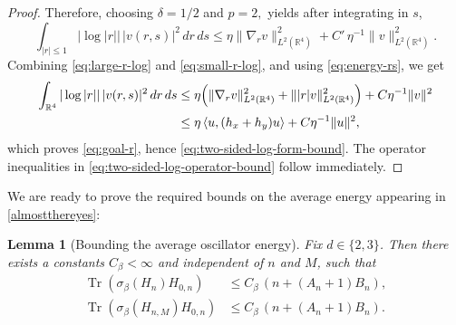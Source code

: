 \documentclass[11pt]{amsart}
\newcommand{\1}{\mathbbm{1}}
\newcommand{\Tr}{\operatorname{Tr}}
\newcommand{\R}{\mathbb{R}}
\theoremstyle{plain}
\newtheorem{lemma}[theorem]{Lemma}
\theoremstyle{definition}
\theoremstyle{remark}
\numberwithin{equation}{section}
\begin{document}
\begin{proof}
Therefore, choosing $\delta = 1/2$ and $p= 2,$ yields after integrating in \(s\),
\begin{equation}
\label{eq:small-r-log}
\int_{|r|\le1}|\log|r||\,|v(r,s)|^2\,dr\,ds
\le
\eta\|\nabla_r v\|_{L^2(\R^4)}^2 + C'\, \eta^{-1}\|v\|_{L^2(\R^4)}^2.
\end{equation}
Combining \eqref{eq:large-r-log} and \eqref{eq:small-r-log}, and using \eqref{eq:energy-rs}, we get
\begin{align*}
\int_{\R^4}|\log|r||\,|v(r,s)|^2\,dr\,ds
&\le
\eta\Bigl(\|\nabla_r v\|_{L^2(\R^4)}^2+\||r|v\|_{L^2(\R^4)}^2\Bigr)+ C \eta^{-1}\|v\|^2\\
&\le
\eta\,\langle u,(h_x+h_y)u\rangle + C \eta^{-1}\|u\|^2,
\end{align*}
which proves \eqref{eq:goal-r}, hence \eqref{eq:two-sided-log-form-bound}. The operator inequalities in \eqref{eq:two-sided-log-operator-bound} follow immediately.
\end{proof}






















\noindent We are ready to prove the required bounds on the average energy appearing in \eqref{almostthereyes}:

\begin{lemma}[Bounding the average oscillator energy]
\label{lem:uniform-H0-bound-abstract-detailed}
Fix \(d\in\{2,3\}\). Then there exists a constants \(C_\beta<\infty\) and independent of \(n\) and \(M\), such that
\begin{align*}
\Tr(\sigma_\beta(H_{n}) H_{0,n})&\le C_\beta\,\left(n + (A_n+1)B_n\right), \\
\Tr(\sigma_\beta(H_{n,M}) H_{0,n})&\le C_\beta\,\left(n + (A_n+1)B_n\right).
\end{align*}
\end{lemma}
\end{document}
